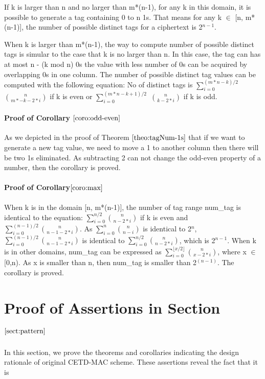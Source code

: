 \documentclass{article}
\begin{document}
If k is larger than n and no larger than m*(n-1), for any k in this domain, it is possible to generate a tag containing 0 to n 1s. That means for any k $\in$ [n, m*(n-1)], the number of possible distinct tags for a ciphertext is 2$^{n-1}$. 

When k is larger than m*(n-1), the way to compute number of possible distinct tags is simular to the case that k is no larger than n. In this case, the tag can has at most n - (k mod n) 0s the value with less number of 0s can be acquired by overlapping 0s in one column. The number of possible distinct tag values can be computed with the following equation:
No of distinct tags is $\sum_{i=0}^{(m*n-k)/2}$ $\binom{n}{m*-k-2*i}$ if k is even or $\sum_{i=0}^{(m*n-k+1)/2}$ $\binom{n}{k-2*i}$ if k is odd.

\paragraph{Proof of Corollary $\ref{coro:odd-even}$}
As we depicted in the proof of Theorem $\ref{theo:tagNum-1s}$ that if we want to generate a new tag value, we need to move a 1 to another column then there will be two 1s eliminated. As subtracting 2 can not change the odd-even property of a number, then the corollary is proved.
\paragraph{Proof of Corollary$\ref{coro:max}$}
When k is in the domain [n, m*(n-1)], the number of tag range num\_tag is identical to the equation: $\sum_{i=0}^{n/2} \binom{n}{n-2*i}$ if k is even and $\sum_{i=0}^{(n-1)/2} \binom{n}{n-1-2*i}$. As $\sum_{i=0}^{n} \binom{n}{n-i}$ is identical to 2$^n$, $\sum_{i=0}^{(n-1)/2} \binom{n}{n-1-2*i}$ is identical to $\sum_{i=0}^{n/2} \binom{n}{n-2*i}$, which is 2$^{n-1}$. 
When k is in other domains, num\_tag can be expressed as $\sum_{i=0}^{\lfloor x/2 \rfloor} \binom{n}{x-2*i}$, where x $\in$ [0,n). As x is smaller than n, then num\_tag is smaller than 2$^(n-1)$. The corollary is proved. 

\section{Proof of Assertions in Section $\ref{sect:pattern}$}
In this section, we prove the theorems and corollaries indicating the design rationale of original CETD-MAC scheme. These assertions reveal the fact that it is 
\end{document}
